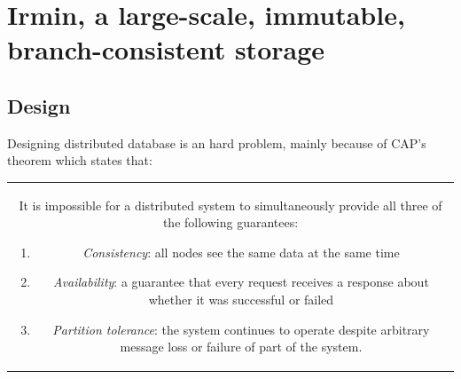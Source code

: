 \documentclass{article}
\renewcommand{\-}{\hyp}
\newcommand{\irmin}{Irmin\xspace}
\newcommand{\lwt}{Lwt\xspace}
\newcommand{\mirage}{Mirage\xspace}
\newcommand{\ocaml}{OCaml\xspace}
\newcommand{\xen}{Xen\xspace}
\begin{document}
%



\section{\irmin, a large-scale, immutable, branch-consistent storage}

\subsection{Design}

Designing distributed database is an hard problem, mainly because of CAP’s theorem\cite{BrewerConjecture2002} which states that:

\bigskip
\begin{tabular}{|c}
\begin{minipage}{0.9\textwidth}
It is impossible for a distributed system to simultaneously provide all three of the following guarantees:
\begin{enumerate}
	\item \emph{Consistency}: all nodes see the same data at the same time
	\item \emph{Availability}: a guarantee that every request receives a response about whether it was successful or failed
	\item \emph{Partition tolerance}: the system continues to operate despite arbitrary message loss or failure of part of the system.
\end{enumerate} 
\end{minipage}
\end{tabular}
\bigskip
\end{document}
